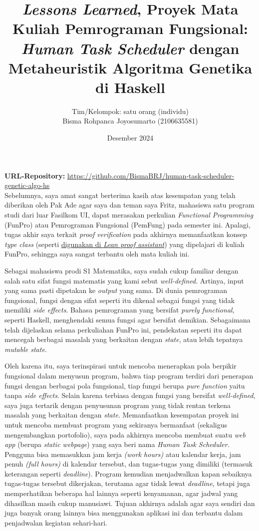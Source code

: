 \documentclass{article}
\title{\textit{Lessons Learned}, Proyek Mata Kuliah Pemrograman Fungsional: \\
\textit{Human Task Scheduler} dengan Metaheuristik Algoritma Genetika di Haskell}
\author{Tim/Kelompok: satu orang (individu) \\
Bisma Rohpanca Joyosumarto (2106635581)}
\date{Desember 2024}
\begin{document}
\maketitle

\noindent
\textbf{URL-Repository:} \url{https://github.com/BismaBRJ/human-task-scheduler-genetic-algo-hs} \\[0.5em]


Sebelumnya, saya amat sangat berterima kasih atas kesempatan yang telah diberikan oleh Pak Ade agar saya dan teman saya Fritz, mahasiswa satu program studi dari luar Fasilkom UI, dapat merasakan perkulian \textit{Functional Programming} (FunPro) atau Pemrograman Fungsional (PemFung) pada semester ini. Apalagi, tugas akhir saya terkait \textit{proof verification} pada akhirnya memanfaatkan konsep \textit{type class} (seperti \href{https://lean-lang.org/theorem_proving_in_lean4/type_classes.html}{digunakan di \textit{Lean proof assistant}}) yang dipelajari di kuliah FunPro, sehingga saya sangat terbantu oleh mata kuliah ini.

Sebagai mahasiswa prodi S1 Matematika, saya sudah cukup familiar dengan salah satu sifat fungsi matematis yang kami sebut \textit{well-defined}. Artinya, input yang sama pasti dipetakan ke \textit{output} yang sama. Di dunia pemrograman fungsional, fungsi dengan sifat seperti itu dikenal sebagai fungsi yang tidak memiliki \textit{side effects}. Bahasa pemrograman yang bersifat \textit{purely functional}, seperti Haskell, menghendaki semua fungsi agar bersifat demikian. Sebagaimana telah dijelaskan selama perkuliahan FunPro ini, pendekatan seperti itu dapat mencegah berbagai masalah yang berkaitan dengan \textit{state}, atau lebih tepatnya \textit{mutable state}.

Oleh karena itu, saya terinspirasi untuk mencoba menerapkan pola berpikir fungsional dalam menyusun program, bahwa tiap program terdiri dari penerapan fungsi dengan berbagai pola fungsional, tiap fungsi berupa \textit{pure function} yaitu tanpa \textit{side effects}. Selain karena terbiasa dengan fungsi yang bersifat \textit{well-defined}, saya juga tertarik dengan penyusunan program yang tidak rentan terkena masalah yang berkaitan dengan \textit{state}. Memanfaatkan kesempatan proyek ini untuk mencoba membuat program yang sekiranya bermanfaat (sekaligus mengembangkan portofolio), saya pada akhirnya mencoba membuat suatu \textit{web app} (berupa \textit{static webpage}) yang saya beri nama \textit{Human Task Scheduler}. Pengguna bisa memasukkan jam kerja \textit{(work hours)} atau kalendar kerja, jam penuh \textit{(full hours)} di kalendar tersebut, dan tugas-tugas yang dimiliki (termasuk keterangan seperti \textit{deadline}). Program kemudian menjadwalkan kapan sebaiknya tugas-tugas tersebut dikerjakan, terutama agar tidak lewat \textit{deadline}, tetapi juga memperhatikan beberapa hal lainnya seperti kenyamanan, agar jadwal yang dihasilkan masih cukup manusiawi. Tujuan akhirnya adalah agar saya sendiri dan juga banyak orang lainnya bisa menggunakan aplikasi ini dan terbantu dalam penjadwalan kegiatan sehari-hari.
\end{document}
